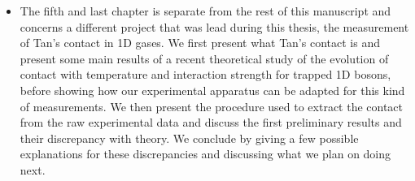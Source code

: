 \begin{itemize}
    \item The fifth and last chapter is separate from the rest of this manuscript and concerns a different project that was lead during this thesis, the measurement of Tan's contact in 1D gases. We first present what Tan's contact is and present some main results of a recent theoretical study \cite{yao2018tan} of the evolution of contact with temperature and interaction strength for trapped 1D bosons, before showing how our experimental apparatus can be adapted for this kind of measurements. We then present the procedure used to extract the contact from the raw experimental data and discuss the first preliminary results and their discrepancy with theory. We conclude by giving a few possible explanations for these discrepancies and discussing what we plan on doing next.
\end{itemize}









